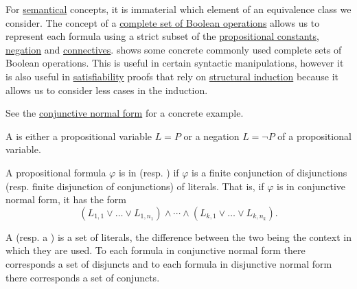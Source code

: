 \begin{remark}\label{remark:smaller_propositional_language}
  For \hyperref[remark:metalanguage_syntax_and_semantics]{semantical} concepts, it is immaterial which element of an equivalence class we consider. The concept of a \hyperref[def:boolean_closure]{complete set of Boolean operations} allows us to represent each formula using a strict subset of the \hyperref[def:propositional_alphabet/constants]{propositional constants}, \hyperref[def:propositional_alphabet/negation]{negation} and \hyperref[def:propositional_alphabet/connectives]{connectives}.  shows some concrete commonly used complete sets of Boolean operations. This is useful in certain syntactic manipulations, however it is also useful in \hyperref[def:propositional_interpretation/satisfiability]{satisfiability} proofs that rely on \hyperref[remark:induction]{structural induction} because it allows us to consider less cases in the induction.

  See the \hyperref[def:conjunctive_disjunctive_normal_form]{conjunctive normal form} for a concrete example.
\end{remark}

\begin{definition}\label{def:conjunctive_disjunctive_normal_form}\mbox{}
  \begin{DefEnum}
     A  is either a propositional variable \( L = P \) or a negation \( L = \neg P \) of a propositional variable.

     A propositional formula \( \varphi \) is in  (resp. ) if \( \varphi \) is a finite conjunction of disjunctions (resp. finite disjunction of conjunctions) of literals. That is, if \( \varphi \) is in conjunctive normal form, it has the form
    \begin{equation*}
      (L_{1,1} \vee \ldots \vee L_{1,n_1}) \wedge \cdots \wedge (L_{k,1} \vee \ldots \vee L_{k,n_k}).
    \end{equation*}

     A  (resp. a ) is a set of literals, the difference between the two being the context in which they are used. To each formula in conjunctive normal form there corresponds a set of disjuncts and to each formula in disjunctive normal form there corresponds a set of conjuncts.
  \end{DefEnum}
\end{definition}

